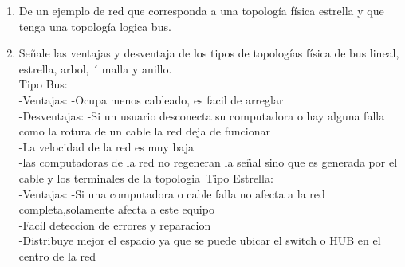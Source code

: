 \documentclass{udparticle}
\begin{document}
\begin{enumerate}
\item De un ejemplo de red que corresponda a una topología física estrella y que tenga una topología
logica bus.

\item Señale las ventajas y desventaja de los tipos de topologías física de bus lineal, estrella, arbol, ´
malla y anillo.\\
    Tipo Bus:\\
        -Ventajas: -Ocupa menos cableado, es facil de arreglar \\
        -Desventajas: -Si un usuario desconecta su computadora o hay alguna falla como la rotura de un cable
                       la red deja de funcionar\\
                      -La velocidad de la red es muy baja\\
                      -las computadoras de la red no regeneran la señal sino que es generada por el cable
                       y los terminales de la topologia\
    Tipo Estrella:\\
        -Ventajas: -Si una computadora o cable falla no afecta a la red completa,solamente afecta a 
                    este equipo\\
                   -Facil deteccion de errores y reparacion\\
                   -Distribuye mejor el espacio ya que se puede ubicar el switch o HUB en el centro de
                    la red\\
            

\end{enumerate}
\end{document}
